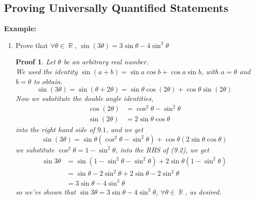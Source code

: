 \documentclass[10pt]{article}
\DeclareMathOperator{\R}{{\mathbb{R}}}
\theoremstyle{break}
\newtheorem*{pf}{Proof}
\begin{document}
\subsection{Proving Universally Quantified Statements}
\textbf{Example:}
\begin{enumerate}
    \item Prove that $\forall \theta \in \R$, $\sin(3 \theta) = 3\sin \theta - 4\sin^3 \theta$
    \begin{pf}
        Let $\theta$ be an arbitrary real number. \\
        We used the identity $\sin(a + b) = \sin a \cos b + \cos a \sin b$, with $a = \theta$ and $b = \theta$ to obtain.
        \begin{equation}
            \sin (3 \theta) = \sin (\theta + 2\theta) = \sin \theta \cos(2 \theta) + \cos \theta \sin(2 \theta)
        \end{equation}
        Now we substitute the double angle identities, 
        \begin{align*}
            \cos(2 \theta) &= \cos^2 \theta - \sin^2 \theta\\
            \sin(2 \theta) &= 2\sin\theta \cos \theta
        \end{align*}
        into the right hand side of $9.1$, and we get
        \begin{equation}
            \sin(3 \theta) = \sin \theta(\cos^2 \theta - \sin^2 \theta) + \cos \theta (2 \sin \theta \cos \theta)
        \end{equation}
        we substitute $\cos^2 \theta = 1 - \sin^2 \theta$, into the RHS of (9.2), we get 
        \begin{align*}
            \sin 3\theta &= \sin(1 - \sin^2\theta - \sin^2 \theta) + 2 \sin \theta(1 - \sin^2 \theta)\\
                         &= \sin \theta - 2 \sin^2 \theta + 2 \sin \theta - 2 \sin^2 \theta\\
                         &= 3 \sin \theta - 4 \sin^3 \theta
        \end{align*}
        so we've shown that $\sin 3 \theta = 3 \sin \theta - 4 \sin^3 \theta$, $\forall \theta \in \R$, as desired.
    \end{pf}
\end{enumerate}
\end{document}
